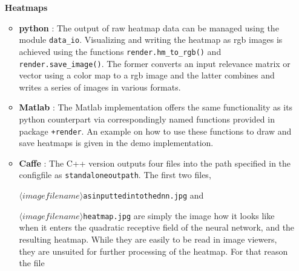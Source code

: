 \documentclass[a4wide]{article}
\begin{document}
\begin{itemize}
\item[{\textbf{Heatmaps}}]
	\begin{itemize}
		\item \textbf{python} : The output of raw heatmap data can be managed using the module \texttt{data\_io}. Visualizing and writing the heatmap as rgb images is achieved using the functions \texttt{render.hm\_to\_rgb()} and \texttt{render.save\_image()}. The former converts an input relevance matrix or vector using a color map to a rgb image and the latter combines and writes a series of images in various formats.
		\item \textbf{Matlab} : The Matlab implementation offers the same functionality as its python counterpart via correspondingly named functions provided in package \texttt{+render}. An example on how to use these functions to draw and save heatmaps is given in the demo implementation.
		\item \textbf{Caffe} : The C++ version outputs four files into the path specified in the configfile as \texttt{standalone\textunderscore outpath}. The first two files,

\texttt{$\langle imagefilename\rangle$\textunderscore as\textunderscore inputted\textunderscore into\textunderscore the\textunderscore dnn.jpg} and

\texttt{$\langle imagefilename\rangle$\textunderscore heatmap.jpg} are simply the image how it looks like when it enters the quadratic receptive field of the neural network, and the resulting heatmap. While they are easily to be read in image viewers, they are unsuited for further processing of the heatmap. For that reason the file


\end{itemize}
\end{itemize}
\end{document}
